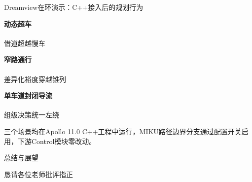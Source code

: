 \documentclass[aspectratio=169,10pt,fontset=none]{ctexbeamer}
\begin{document}
\begin{frame}{Dreamview在环演示：C++接入后的规划行为}
\centering
\small

\centering\textbf{动态超车}\\[3pt]
\\[2pt]
{\footnotesize 借道超越慢车}


\centering\textbf{窄路通行}\\[3pt]
\\[2pt]
{\footnotesize 差异化裕度穿越锥列}


\centering\textbf{单车道封闭导流}\\[3pt]
\\[2pt]
{\footnotesize 组级决策统一左绕}

{\footnotesize 三个场景均在Apollo 11.0 C++工程中运行，MIKU路径边界分支通过配置开关启用，下游Control模块零改动。}
\end{frame}

\begin{frame}{总结与展望}
\centering
{}
\end{frame}


\begin{frame}
  \vfill
  \vspace*{0.35cm}
  \begin{center}
    {\Huge 恳请各位老师批评指正}
  \end{center}
  \vfill
\end{frame}
\end{document}

